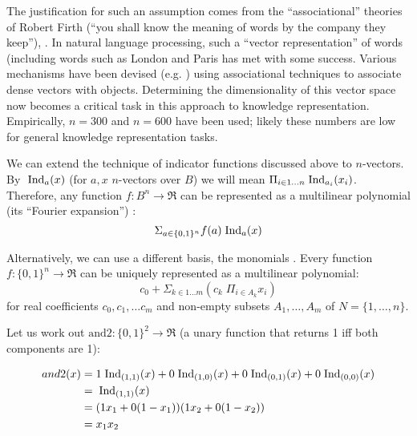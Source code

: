 \documentclass{article} %
\begin{document}
The justification for such an assumption  comes from the ``associational'' theories of Robert Firth (``you shall know the meaning of words by the company they keep''), \cite{firth-57}. In natural language processing, such a ``vector representation'' of words (including words such as {\sc London} and {\sc Paris} has met with some success.  Various mechanisms have been devised (e.g.{} \cite{word-to-vec}) using associational techniques to associate dense vectors with objects. Determining the dimensionality of this vector space now becomes a critical task in this approach to knowledge representation. Empirically, \(n=300\) and \(n=600\) have been used; likely these numbers are low for general knowledge representation tasks. 



We can extend the technique of indicator functions discussed above to $n$-vectors. By $\;\mbox{Ind}_a(x)$ (for $a,x$ $n$-vectors over \(B\)) we will mean \(\Pi_{i   \in 1\ldots n} \;\mbox{Ind}_{a_i}(x_i)\).  Therefore, any function \(f:B^n \rightarrow \Re\) can be represented as a multilinear polynomial (its ``Fourier expansion'') \cite{boolean-function}: 
\[\Sigma_{a \in \{0,1\}^n} f(a)\;\mbox{Ind}_{a}(x)\]

Alternatively, we can use a different basis, the monomials \cite{PB-optimization}. Every
function $f:\{0,1\}^n \rightarrow \Re$ can be uniquely represented as a multilinear polynomial: 
$$ c_0 + \Sigma_{k \in 1\ldots m} (c_k\; \Pi_{i \in A_k} x_i)$$
\noindent for real coefficients $c_0, c_1, \ldots c_m$ and non-empty subsets $A_1, \ldots, A_m$ of $N = \{1, \ldots, n\}$. 

\begin{example}
Let us work out $\mbox{and2}: \{0,1\}^2 \rightarrow \Re$ (a unary function that returns 1 iff both components are 1):

\begin{align*}
and2(x)  &= 1 \;\mbox{Ind}_{(1,1)}(x) + 0\;\mbox{Ind}_{(1,0)}(x) + 0\;\mbox{Ind}_{(0,1)}(x) + 0\;\mbox{Ind}_{(0,0)}(x)\\
&= \;\mbox{Ind}_{(1,1)}(x) \\
&= (1  x_1+0(1-x_1))(1  x_2+0(1-x_2))\\
  &=x_1 x_2 
\end{align*}
\end{example}
\end{document}
